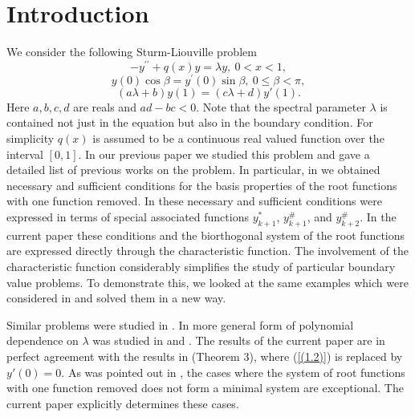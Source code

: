 \documentclass[pdflatex,sn-mathphys-num]{sn-jnl}%
\theoremstyle{thmstyleone}%
\theoremstyle{thmstyletwo}%
\theoremstyle{thmstylethree}%
\theoremstyle{definition}
\theoremstyle{remark}
\numberwithin{equation}{section}
\begin{document}
\section{Introduction}\label{sec1}

We consider the following Sturm-Liouville problem
\begin{equation}
  -y^{\prime \prime }+q(x)y=\lambda y,\ 0<x<1,  \label{(1.1)} 
\end{equation}
\begin{equation}
y(0)\cos \beta =y^{\prime }(0)\sin \beta ,\ 0\leq \beta <\pi ,
\label{(1.2)}
\end{equation}
\begin{equation}
(a\lambda + b)y(1) = (c\lambda + d)y{'}(1). \label{(1.3)}
\end{equation}
Here $a,b,c,d$ are reals and $ad-bc<0$. Note that the spectral parameter $\lambda $ is contained not just in the equation but also in the boundary condition. For simplicity $q(x)$ is assumed to be a continuous real valued function over the interval $[0,1]$. In our previous paper \cite{aliyev5} we studied this problem and gave a detailed list of previous works on the problem. In particular, in \cite{aliyev5} we obtained necessary and sufficient conditions for the basis properties of the root functions with one function removed. In \cite{aliyev5} these necessary and sufficient conditions were expressed in terms of special associated functions $y_{k+1}^*$, $y_{k+1}^\#$, and $y_{k+2}^\#$. In the current paper these conditions and the biorthogonal system of the root functions  are expressed directly through the characteristic function. The involvement of the characteristic function considerably simplifies the study of particular boundary value problems. To demonstrate this, we looked at the same examples which were considered in \cite{aliyev5} and solved them in a new way.

Similar problems were  studied in \cite{fulton,kerimov1, aliyev1, aliyev2, zaliyev1,benedek, li, guliyev, kerimov, mois, maris, moller, olgar}. In more general form of polynomial dependence on $\lambda$ was studied in \cite{rus} and \cite{shkalikov1}. The results of the current paper are in perfect agreement with the results in \cite{shkalikov2} (Theorem 3), where (\ref{(1.2)}) is replaced by $y'(0)=0$. As was pointed out in \cite{shkalikov2}, the cases where the system of root functions with one function removed does not form a minimal system are exceptional. The current paper explicitly determines these cases.
\end{document}
